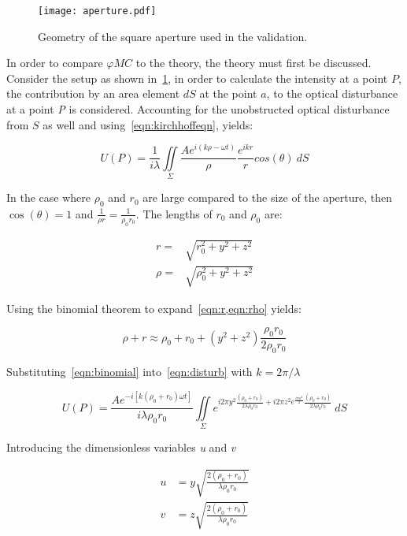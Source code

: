 \medskip
\begin{figure}[!ht]
    \centering
    \texttt{[image: aperture.pdf]}
    \caption{Geometry of the square aperture used in the validation.}
    \label{fig:aperture}
\end{figure}

In order to compare $\varphi MC$ to the theory, the theory must first be discussed.
Consider the setup as shown in~\cref{fig:aperture}, in order to calculate the intensity at a point $P$, the contribution by an area element $dS$ at the point $a$, to the optical disturbance at a point \textit{P} is considered.
Accounting for the unobstructed optical disturbance from $S$ as well and using~\cref{eqn:kirchhoffeqn}, yields: 


\begin{equation}
U(P)=\frac{1}{i\lambda}\iint\limits_{\Sigma} \frac{Ae^{i(k\rho-\omega t)}}{\rho} \frac{e^{ikr}}{r}cos(\theta)\ dS
\label{eqn:disturb}
\end{equation}


In the case where $\rho_0$ and $r_0$ are large compared to the size of the aperture, then $\cos\left(\theta\right) = 1$ and $\tfrac{1}{\rho r}=\tfrac{1}{\rho_0 r_0}$.
The lengths of $r_0$ and $\rho_0$ are:

\begin{align}
r=&\sqrt{r_0^2+y^2+z^2}\label{eqn:r} \\
\rho=&\sqrt{\rho_0^2+y^2+z^2}\label{eqn:rho}
\end{align}

Using the binomial theorem to expand~\cref{eqn:r,eqn:rho} yields:

\begin{equation}
\rho + r \approx \rho_0 + r_0 + (y^2+z^2)\frac{\rho_0r_0}{2\rho_0r_0}
\label{eqn:binomial}
\end{equation}

Substituting~\cref{eqn:binomial} into~\cref{eqn:disturb} with $k=2\pi/\lambda$

\begin{equation}
U(P)=\frac{Ae^{-i[k(\rho_0+r_0)\omega t]}}{i\lambda\rho_0r_0}\iint\limits_{\Sigma} e^{i2\pi y^2\tfrac{(\rho_0+r_0)}{2\lambda\rho_0r_0}+i2\pi z^2e^{\frac{i\pi u^2}{2}}\tfrac{(\rho_0+r_0)}{2\lambda\rho_0r_0}} \ dS
\label{eqn:midway}
\end{equation}


Introducing the dimensionless variables \textit{u} and \textit{v}

\begin{align}
u&=y\sqrt{\frac{2(\rho_0+r_0)}{\lambda\rho_0r_0}}\\
v&=z\sqrt{\frac{2(\rho_0+r_0)}{\lambda\rho_0r_0}}
\end{align}

